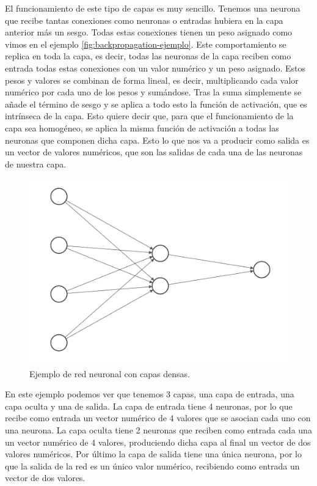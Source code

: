 El funcionamiento de este tipo de capas es muy sencillo. Tenemos una neurona que recibe tantas conexiones como neuronas o entradas hubiera en la capa anterior más un sesgo. Todas estas conexiones tienen un peso asignado como vimos en el ejemplo \ref{fig:backpropagation-ejemplo}. Este comportamiento se replica en toda la capa, es decir, todas las neuronas de la capa reciben como entrada todas estas conexiones con un valor numérico y un peso asignado. Estos pesos y valores se combinan de forma lineal, es decir, multiplicando cada valor numérico por cada uno de los pesos y sumándose. Tras la suma simplemente se añade el término de sesgo y se aplica a todo esto la función de activación, que es intrínseca de la capa. Esto quiere decir que, para que el funcionamiento de la capa sea homogéneo, se aplica la misma función de activación a todas las neuronas que componen dicha capa. Esto lo que nos va a producir como salida es un vector de valores numéricos, que son las salidas de cada una de las neuronas de nuestra capa.

\begin{figure}[H]
	\centering
	\includegraphics[scale=0.5]{imagenes/fcnn_example.png}
	\caption{Ejemplo de red neuronal con capas densas.}
	\label{img:ejemplo-fcnn}
\end{figure}

En este ejemplo podemos ver que tenemos 3 capas, una capa de entrada, una capa oculta y una de salida. La capa de entrada tiene 4 neuronas, por lo que recibe como entrada un vector numérico de 4 valores que se asocian cada uno con una neurona. La capa oculta tiene 2 neuronas que reciben como entrada cada una un vector numérico de 4 valores, produciendo dicha capa al final un vector de dos valores numéricos. Por último la capa de salida tiene una única neurona, por lo que la salida de la red es un único valor numérico, recibiendo como entrada un vector de dos valores.

